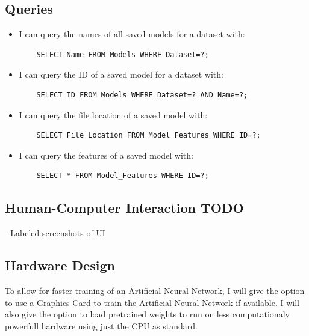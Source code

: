 \documentclass[./project-report/src/latex/project-report.tex]{subfiles}
\begin{document}
\subsection{Queries}

\begin{itemize}
    \item I can query the names of all saved models for a dataset with:
    \begin{verbatim}
    SELECT Name FROM Models WHERE Dataset=?;
    \end{verbatim}
    \item I can query the ID of a saved model for a dataset with:
    \begin{verbatim}
    SELECT ID FROM Models WHERE Dataset=? AND Name=?;
    \end{verbatim}
    \item I can query the file location of a saved model with:
    \begin{verbatim}
    SELECT File_Location FROM Model_Features WHERE ID=?;
    \end{verbatim}
    \item I can query the features of a saved model with:
    \begin{verbatim}
    SELECT * FROM Model_Features WHERE ID=?;
    \end{verbatim}
\end{itemize}

\subsection{Human-Computer Interaction TODO}

- Labeled screenshots of UI

\subsection{Hardware Design}

To allow for faster training of an Artificial Neural Network, I will give the option to use a Graphics Card to train the Artificial Neural Network if available. 
I will also give the option to load pretrained weights to run on less computationaly powerfull hardware using just the CPU as standard.
\end{document}
